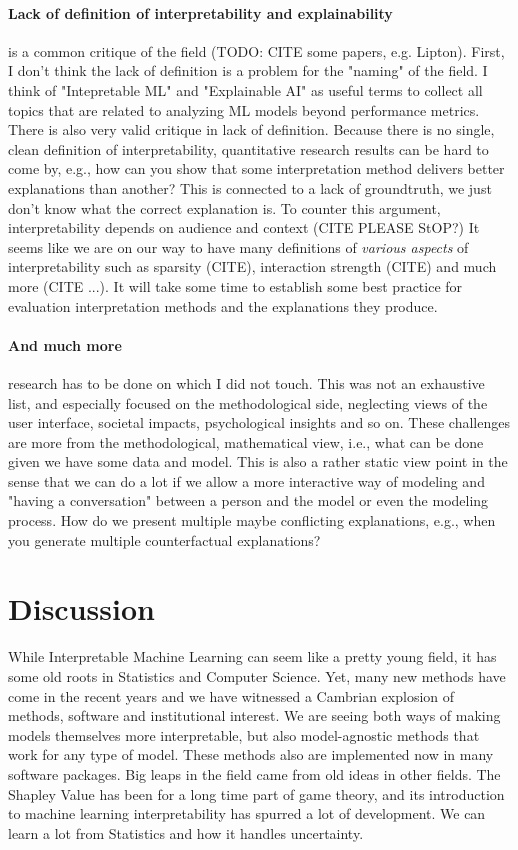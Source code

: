 \documentclass[runningheads]{llncs}
\begin{document}
\paragraph{Lack of definition of interpretability and explainability} is a common critique of the field (TODO: CITE some papers, e.g. Lipton).
First, I don't think the lack of definition is a problem for the "naming" of the field.
I think of "Intepretable ML" and "Explainable AI" as useful terms to collect all topics that are related to analyzing ML models beyond performance metrics.
There is also very valid critique in lack of definition.
Because there is no single, clean definition of interpretability, quantitative research results can be hard to come by, e.g., how can you show that some interpretation method delivers better explanations than another?
This is connected to a lack of groundtruth, we just don't know what the correct explanation is.
To counter this argument, interpretability depends on audience and context (CITE PLEASE StOP?)
It seems like we are on our way to have many definitions of \textit{various aspects} of interpretability such as sparsity (CITE), interaction strength (CITE) and much more (CITE ...).
It will take some time to establish some best practice for evaluation interpretation methods and the explanations they produce.

\paragraph{And much more} research has to be done on which I did not touch.
This was not an exhaustive list, and especially focused on the methodological side, neglecting views of the user interface, societal impacts, psychological insights and so on.
These challenges are more from the methodological, mathematical view, i.e., what can be done given we have some data and model.
This is also a rather static view point in the sense that we can do a lot if we allow a more interactive way of modeling and "having a conversation" between a person and the model or even the modeling process.
How do we present multiple maybe conflicting explanations, e.g., when you generate multiple counterfactual explanations?

\section{Discussion}

While Interpretable Machine Learning can seem like a pretty young field, it has some old roots in Statistics and Computer Science.
Yet, many new methods have come in the recent years and we have witnessed a Cambrian explosion of methods, software and institutional interest.
We are seeing both ways of making models themselves more interpretable, but also model-agnostic methods that work for any type of model.
These methods also are implemented now in many software packages.
Big leaps in the field came from old ideas in other fields.
The Shapley Value has been for a long time part of game theory, and its introduction to machine learning interpretability has spurred a lot of development.
We can learn a lot from Statistics and how it handles uncertainty.

%
%
%
% 
%

\vskip 0.2in


\end{document}
